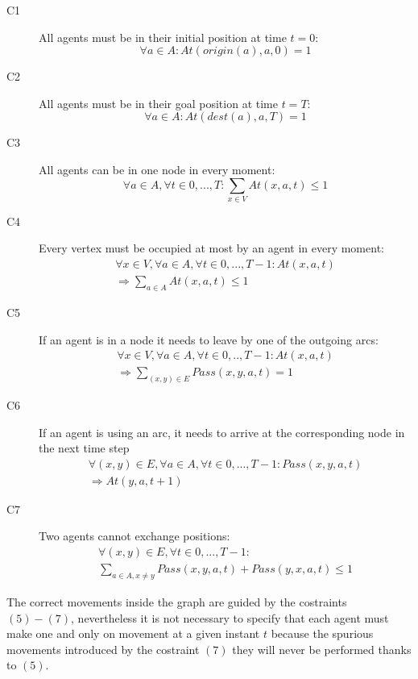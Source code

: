\documentclass[12pt, a4paper, hidelinks]{article}
\begin{document}
\begin{description}
\item [C1] All agents must be in their initial position at time $t = 0$: 
\begin{equation}
\forall a \in A: At(origin(a), a, 0) = 1
\end{equation}
\item [C2] All agents must be in their goal position at time $t = T$: 
\begin{equation}
\forall a \in A : At(dest(a), a, T) = 1
\end{equation}
\item [C3] All agents can be in one node in every moment: 
\begin{equation}
\forall a \in A, \forall t \in {0,...,T}: \displaystyle\sum_{x \in V}At(x,a,t)\leq1
\end{equation}
\item [C4] Every vertex must be occupied at most by an agent in every moment:
\begin{equation}\begin{split}
\forall x \in V, \forall a \in A, \forall t \in {0,...,T-1}: At(x, a, t) \\ 
\Rightarrow \displaystyle\sum_{a \in A}At(x,a,t)\leq1
\end{split}\end{equation}
\item [C5] If an agent is in a node it needs to leave by one of the outgoing arcs:
\begin{equation}\begin{split}
\forall x \in V, \forall a \in A, \forall t \in {0,..,T-1}: At(x,a,t) \\
\Rightarrow  \displaystyle\sum_{(x,y) \in E}Pass(x,y,a,t)=1
\end{split}\end{equation}
\item [C6] If an agent is using an arc, it needs to arrive at the corresponding node in the next time step
\begin{equation}\begin{split}
\forall (x,y) \in E, \forall a \in A, \forall t \in {0,...,T-1}: Pass(x,y,a,t) \\
\Rightarrow At(y,a,t+1)
\end{split}\end{equation}
\item [C7] Two agents cannot exchange positions:
\begin{equation}\begin{split}
\forall (x,y) \in E, \forall t \in {0,...,T-1}: \\
\displaystyle\sum_{a \in A, x \neq y}Pass(x,y,a,t) + Pass(y,x,a,t) \leq 1
\end{split}\end{equation}
\end{description}

The correct movements inside the graph are guided by the costraints $(5)-(7)$, nevertheless it is not necessary to specify that each agent must make one and only on movement at a given instant $t$ because the spurious movements introduced by the costraint $(7)$ they will never be performed thanks to $(5)$.
\end{document}
